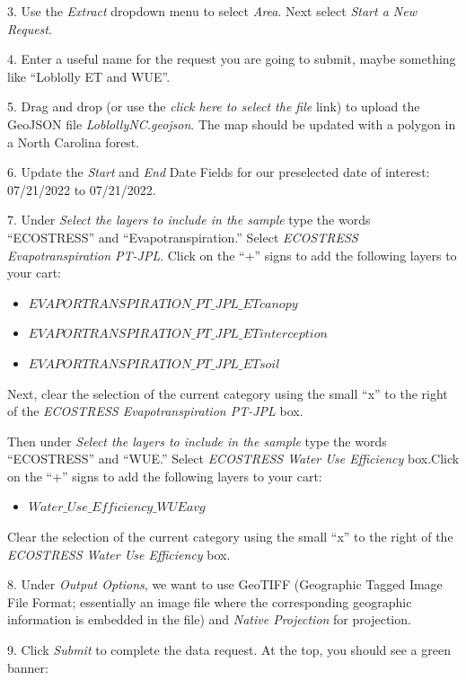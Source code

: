 \documentclass[oneside,a4paper,11pt,explicit]{book}
\begin{document}
3. Use the \textit{Extract} dropdown menu to select \textit{Area}. Next select \textit{Start a New Request}. 

4. Enter a useful name for the request you are going to submit, maybe something like ``Loblolly ET and WUE''. 

5. Drag and drop (or use the \textit{click here to select the file} link) to upload the GeoJSON file \textit{LoblollyNC.geojson}. The map should be updated with a polygon in a North Carolina forest.

6. Update the \textit{Start} and \textit{End} Date Fields for our preselected date of interest: 07/21/2022 to 07/21/2022.

7. Under \textit{Select the layers to include in the sample} type the words ``ECOSTRESS'' and ``Evapotranspiration.'' Select \textit{ECOSTRESS Evapotranspiration PT-JPL}. Click on the ``+'' signs to add the following layers to your cart: 

\begin{itemize}
	\item $EVAPORTRANSPIRATION\_PT\_JPL\_ETcanopy$
	\item $EVAPORTRANSPIRATION\_PT\_JPL\_ETinterception$
	\item $EVAPORTRANSPIRATION\_PT\_JPL\_ETsoil$
\end{itemize}

Next, clear the selection of the current category using the small ``x'' to the right of the \textit{ECOSTRESS Evapotranspiration PT-JPL} box.

Then under \textit{Select the layers to include in the sample} type the words ``ECOSTRESS'' and ``WUE.'' Select \textit{ECOSTRESS Water Use Efficiency} box.Click on the ``+'' signs to add the following layers to your cart: 

\begin{itemize}
	\item $Water\_Use\_Efficiency\_WUEavg$
\end{itemize}

Clear the selection of the current category using the small ``x'' to the right of the \textit{ECOSTRESS Water Use Efficiency} box.

8. Under \textit{Output Options}, we want to use GeoTIFF (Geographic Tagged Image File Format; essentially an image file where the corresponding geographic information is embedded in the file) and \textit{Native Projection} for projection.

9. Click \textit{Submit} to complete the data request. At the top, you should see a green banner:
\end{document}
